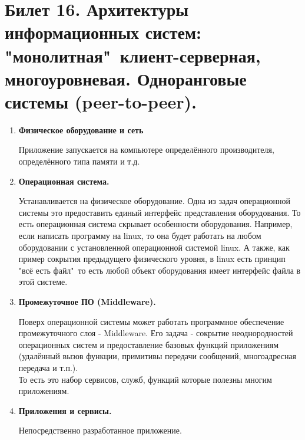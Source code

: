 \newpage
\section{Билет 16. Архитектуры информационных систем: "монолитная"\, клиент-серверная, многоуровневая. Одноранговые системы (peer-to-peer).}

\begin{enumerate}
\setlength\itemsep{0.0001em}
\item \textbf{Физическое оборудование и сеть}

Приложение запускается на компьютере определённого производителя, определённого типа памяти и т.д.

\item \textbf{Операционная система.}

Устанавливается на физическое оборудование. Одна из задач операционной системы это предоставить единый интерфейс представления оборудования. То есть операционная система скрывает особенности оборудования. Например, если написать программу на linux, то она будет работать на любом оборудовании с установленной операционной системой linux. А также, как пример сокрытия предыдущего физического уровня, в linux есть принцип "всё есть файл"\, то есть любой объект оборудования имеет интерфейс файла в этой системе. 

\item \textbf{Промежуточное ПО (Middleware).}

Поверх операционной системы может работать программное обеспечение промежуточного слоя - Middleware.
Его задача - сокрытие неоднородностей операционных систем и предоставление базовых функций приложениям (удалённый вызов функции, примитивы передачи сообщений, многоадресная передача и т.п.).\\
То есть это набор сервисов, служб, функций которые полезны многим приложениям.

\item \textbf{Приложения и сервисы.}

Непосредственно разработанное приложение.
\end{enumerate}

